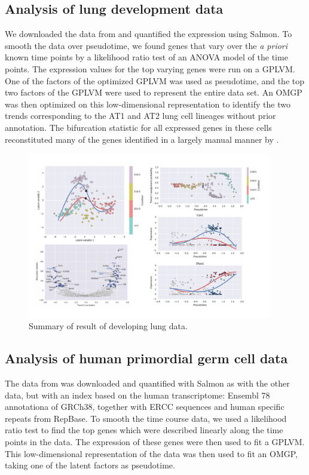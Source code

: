 \subsection{Analysis of lung development data}

We downloaded the data from \cite{Treutlein2014-rz} and quantified the expression using Salmon. To smooth the data over pseudotime, we found genes that vary over the \textit{a priori} known time points by a likelihood ratio test of an ANOVA model of the time points. The expression values for the top varying genes were run on a GPLVM. One of the factors of the optimized GPLVM was used as pseudotime, and the top two factors of the GPLVM were used to represent the entire data set. An OMGP was then optimized on this low-dimensional representation to identify the two trends corresponding to the AT1 and AT2 lung cell lineages without prior annotation. The bifurcation statistic for all expressed genes in these cells reconstituted many of the genes identified in a largely manual manner by \cite{Treutlein2014-rz}.

\begin{figure}
    \centering
    \includegraphics[width=0.95\textwidth]{"fig-treutlein"}
    \caption{Summary of  result of \citet{Treutlein2014-rz} developing lung data.}
    \label{fig:treutlein}
\end{figure}

\subsection{Analysis of human primordial germ cell data}

The data from \cite{Guo2015-ao} was downloaded and quantified with Salmon as with the other data, but with an index based on the human transcriptome: Ensembl 78 annotationa of GRCh38, together with ERCC sequences and human specific repeats from RepBase. To smooth the time course data, we used a likelihood ratio test to find the top genes which were described linearly along the time points in the data. The expression of these genes were then used to fit a GPLVM. This low-dimensional representation of the data was then used to fit an OMGP, taking one of the latent factors as pseudotime.

